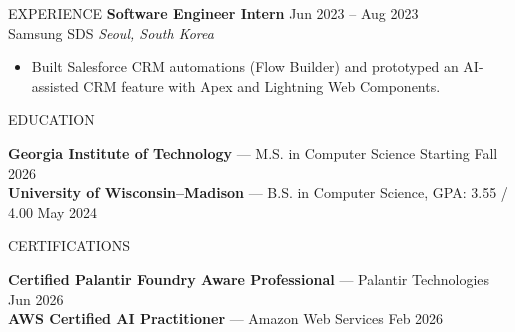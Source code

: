 \documentclass{resume} %
\begin{document}
\begin{rSection}{EXPERIENCE}
\vspace{4pt}
\textbf{Software Engineer Intern} \hfill Jun 2023 -- Aug 2023\\
Samsung SDS \hfill \textit{Seoul, South Korea}
\begin{itemize}
    \itemsep -3pt {}
    \item Built Salesforce CRM automations (Flow Builder) and prototyped an AI-assisted CRM feature with Apex and Lightning Web Components.
\end{itemize}

\end{rSection}

\begin{rSection}{EDUCATION}

\textbf{Georgia Institute of Technology} --- M.S. in Computer Science \hfill Starting Fall 2026 \\
\textbf{University of Wisconsin--Madison} --- B.S. in Computer Science, GPA: 3.55 / 4.00 \hfill May 2024

\end{rSection}

\begin{rSection}{CERTIFICATIONS}

\textbf{Certified Palantir Foundry Aware Professional} --- Palantir Technologies \hfill Jun 2026 \\
\textbf{AWS Certified AI Practitioner} --- Amazon Web Services \hfill Feb 2026

\end{rSection}
\end{document}
